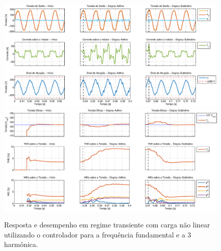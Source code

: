 \documentclass[repeatfields,oneside]{tcc}
\begin{document}
\begin{figure}[h]
    \centering
    \caption{Resposta e desempenho em regime transiente com carga não linear utilizando o controlador para a frequência fundamental e a 3{\textordfeminine} harmônica.}
    \includegraphics[trim={80 50 1 20}, clip, width=\linewidth]{fig/closed_3.eps}
    \\\vspace{0.475cm}
    \includegraphics[trim={80 20 1 20}, clip, width=\linewidth]{fig/harm_3.eps}
\end{figure}
\end{document}
